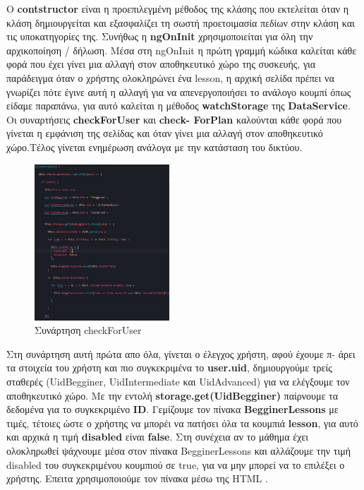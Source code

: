 \documentclass[a4paper,12pt]{article}
\begin{document}
			Ο \textbf{contstructor} είναι η προεπιλεγμένη μέθοδος της κλάσης που εκτελείται όταν η κλάση δημιουργείται και εξασφαλίζει τη σωστή προετοιμασία πεδίων στην κλάση και τις υποκατηγορίες της.
			Συνήθως η \textbf{ngOnInit} χρησιμοποιείται για όλη την αρχικοποίηση / δήλωση. Μέσα στη ngOnInit η πρώτη γραμμή κώδικα καλείται κάθε φορά που έχει γίνει μια αλλαγή στον αποθηκευτικό χώρο της συσκευής, για παράδειγμα όταν ο χρήστης ολοκληρώνει ένα lesson, η αρχική σελίδα πρέπει να γνωρίζει πότε έγινε αυτή η αλλαγή για να απενεργοποιήσει το ανάλογο κουμπί όπως είδαμε παραπάνω, για αυτό καλείται η
			μέθοδος \textbf{watchStorage} της \textbf{DataService}. Οι συναρτήσεις \textbf{checkForUser} και \textbf{check-
			ForPlan} καλούνται κάθε φορά που γίνεται η εμφάνιση της σελίδας και όταν γίνει μια αλλαγή στον αποθηκευτικό χώρο.Τέλος γίνεται ενημέρωση ανάλογα με την κατάσταση του δικτύου.

			\newpage
			\begin{figure}
				
				\caption{Συνάρτηση checkForUser}
				\vspace*{0.5cm}

				\includegraphics[width=0.45\textwidth]{checkUser}	
			\end{figure}

			Στη συνάρτηση αυτή πρώτα απο όλα, γίνεται ο έλεγχος χρήστη, αφού έχουμε π-
			άρει τα στοιχεία του χρήστη και πιο συγκεκριμένα το \textbf{user.uid}, δημιουργούμε τρείς σταθερές (UidBegginer, UidIntermediate και UidAdvanced) για να ελέγξουμε τον αποθηκευτικό χώρο. Με την εντολή \newline
			\textbf{storage.get(UidBegginer)} παίρνουμε τα δεδομένα για το συγκεκριμένο \textbf{ID}. Γεμίζουμε τον πίνακα \textbf{BegginerLessons} με τιμές, τέτοιες ώστε ο χρήστης να μπορέι να πατήσει
			 όλα τα κουμπιά \textbf{lesson}, για αυτό και αρχικά η τιμή \textbf{disabled} είναι \textbf{false}. Στη συνέχεια αν το μάθημα έχει ολοκληρωθεί ψάχνουμε μέσα στον πίνακα BegginerLessons και αλλάζουμε την τιμή disabled του συγκεκριμένου κουμπιού σε true, για να μην μπορεί να το επιλέξει ο χρήστης. Επειτα χρησιμοποιούμε τον πίνακα μέσω της HTML .
\end{document}
